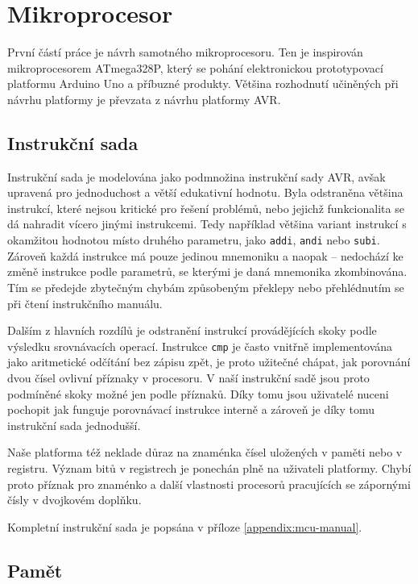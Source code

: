 \chapter{Mikroprocesor}

První částí práce je návrh samotného mikroprocesoru. Ten je inspirován mikroprocesorem ATmega328P, který se pohání elektronickou prototypovací platformu Arduino Uno a příbuzné produkty. Většina rozhodnutí učiněných při návrhu platformy je převzata z návrhu platformy AVR.

\section{Instrukční sada}

Instrukční sada je modelována jako podmnožina instrukční sady AVR, avšak upravená pro jednoduchost a větší edukativní hodnotu. Byla odstraněna většina instrukcí, které nejsou kritické pro řešení problémů, nebo jejichž funkcionalita se dá nahradit vícero jinými instrukcemi. Tedy například většina variant instrukcí s okamžitou hodnotou místo druhého parametru, jako \texttt{addi}, \texttt{andi} nebo \texttt{subi}. Zároveň každá instrukce má pouze jedinou mnemoniku a naopak -- nedochází ke změně instrukce podle parametrů, se kterými je daná mnemonika zkombinována. Tím se předejde zbytečným chybám způsobeným překlepy nebo přehlédnutím se při čtení instrukčního manuálu.

Dalším z hlavních rozdílů je odstranění instrukcí provádějících skoky podle výsledku srovnávacích operací. Instrukce \texttt{cmp} je často vnitřně implementována jako aritmetické odčítání bez zápisu zpět\todocite, je proto užitečné chápat, jak porovnání dvou čísel ovlivní příznaky v procesoru. V naší instrukční sadě jsou proto podmíněné skoky možné jen podle příznaků. Díky tomu jsou uživatelé nuceni pochopit jak funguje porovnávací instrukce interně a zároveň je díky tomu instrukční sada jednodušší.

Naše platforma též neklade důraz na znaménka čísel uložených v paměti nebo v registru. Význam bitů v registrech je ponechán plně na uživateli platformy. Chybí proto příznak pro znaménko a další vlastnosti procesorů pracujících se zápornými čísly v dvojkovém doplňku.

Kompletní instrukční sada je popsána v příloze \ref{appendix:mcu-manual}.

\section{Pamět}

